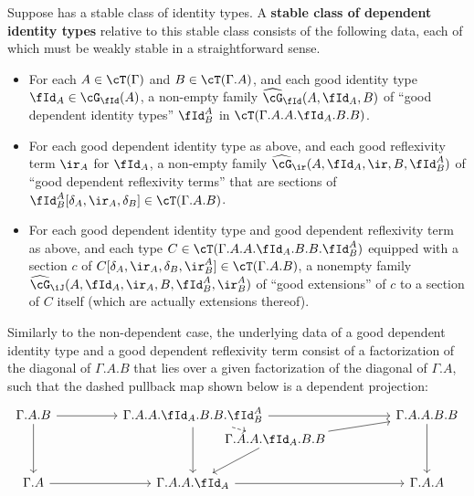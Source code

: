 \documentclass{amsart}
\let\J\iJ
\let\C\cC
\let\T\cT
\let\r\ir
\let\Id\fId
\let\G\cG
\def\dG{\widehat{\G}}
\begin{document}
\begin{defn}\label{defn:dep-id}
  Suppose \C has a stable class of identity types.
  A \textbf{stable class of dependent identity types} relative to this stable class consists of the following data, each of which must be weakly stable in a straightforward sense.
  \begin{itemize}
  \item For each $A\in\T(\Gamma)$ and $B\in\T(\Gamma.A)$, and each good identity type $\Id_A\in \G_\Id(A)$, a non-empty family $\dG_\Id(A,\Id_A,B)$ of ``good dependent identity types'' $\Id^A_B$ in $\T(\Gamma.A.A.\Id_A.B.B)$.
  \item For each good dependent identity type as above, and each good reflexivity term $\r_A$ for $\Id_A$, a non-empty family $\dG_\r(A,\Id_A,\r,B,\Id^A_B)$ of ``good dependent reflexivity terms'' that are sections of $\Id^A_B[\delta_A,\r_A,\delta_B] \in \T(\Gamma.A.B)$.
  \item For each good dependent identity type and good dependent reflexivity term as above, and each type $C\in \T(\Gamma.A.A.\Id_A.B.B.\Id^A_B)$ equipped with a section $c$ of $C[\delta_A,\r_A,\delta_B,\r^A_B]\in \T(\Gamma.A.B)$, a nonempty family $\dG_\J(A,\Id_A,\r_A,B,\Id^A_B,\r^A_B)$ of ``good extensions'' of $c$ to a section of $C$ itself (which are actually extensions thereof).
  \end{itemize}
\end{defn}

Similarly to the non-dependent case, the underlying data of a good dependent identity type and a good dependent reflexivity term consist of a factorization of the diagonal of $\Gamma.A.B$ that lies over a given factorization of the diagonal of $\Gamma.A$, such that the dashed pullback map shown below is a dependent projection:
\[
\begin{tikzcd}[row sep=huge,column sep=huge]
  \Gamma.A.B \ar[r] \ar[d] & \Gamma.A.A.\Id_A.B.B.\Id^A_B \ar[rr] \ar[d] \ar[drr,phantom,near start,"\Gamma.A.A.\Id_A.B.B"{name=hi}] \ar[dashed,to=hi] && \Gamma.A.A.B.B \ar[d] \ar[from=hi] \\
  \Gamma.A \ar[r] & \Gamma.A.A.\Id_A \ar[rr] \ar[from=hi] && \Gamma.A.A
\end{tikzcd}
\]
\end{document}
